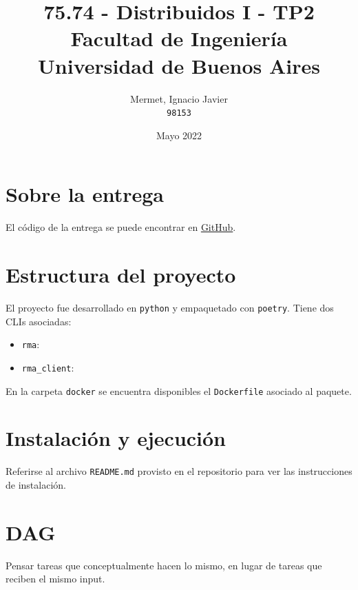 \documentclass[titlepage,a4paper,oneside]{article}
\begin{document}
\begin{titlepage}
\title{
	75.74 \-- Distribuidos I \-- TP2\\
    \large Facultad de Ingeniería\\
	Universidad de Buenos Aires
}
\author{
	Mermet, Ignacio Javier\\
	\texttt{98153}
}
\date{Mayo 2022}

\maketitle

\end{titlepage}

\tableofcontents

\newpage

\section{Sobre la entrega}
El código de la entrega se puede encontrar en \href{https://github.com/CrossNox/7574-TP2}{GitHub}.

\section{Estructura del proyecto}
El proyecto fue desarrollado en \texttt{python}\cite{Python} y empaquetado con \texttt{poetry}\cite{PythonPoetry}. Tiene dos CLIs asociadas:

\begin{itemize}
	\item \texttt{rma}:
	\item \texttt{rma\_client}:
\end{itemize}

En la carpeta \texttt{docker} se encuentra disponibles el \texttt{Dockerfile} asociado al paquete.

\section{Instalación y ejecución}
Referirse al archivo \texttt{README.md} provisto en el repositorio para ver las instrucciones de instalación.

\section{DAG}
Pensar tareas que conceptualmente hacen lo mismo, en lugar de tareas que reciben el mismo input.
\end{document}
